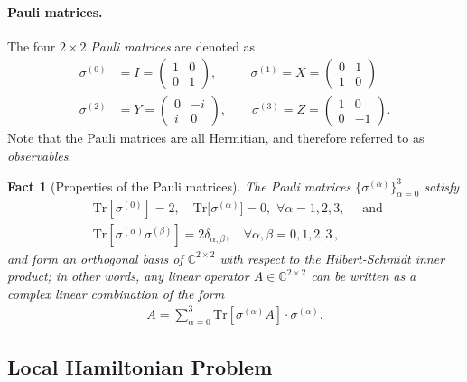 \documentclass[11pt]{article}
\theoremstyle{plain}
\newtheorem{fact}[theorem]{Fact}
\begin{document}
\paragraph{Pauli matrices.} The four $2\times 2$ \emph{Pauli matrices} are denoted as
    \begin{align}
        \sigma^{(0)} &= I = \begin{pmatrix} 1 & 0 \\0 & 1 \end{pmatrix}, \quad\quad\,\,\,\,\sigma^{(1)} = X = \begin{pmatrix} 0 & 1 \\ 1 & 0 \end{pmatrix}\\ \sigma^{(2)} &= Y = \begin{pmatrix} 0 & -i \\ i & 0 \end{pmatrix}, \quad\quad \sigma^{(3)} = Z = \begin{pmatrix} 1 & 0 \\ 0 & -1 \end{pmatrix}.
    \end{align}
Note that the Pauli matrices are all Hermitian, and therefore referred to as \emph{observables}.

\begin{fact}[Properties of the Pauli matrices]\label{fact:pauli-properties}
The Pauli matrices $\{\sigma^{(\alpha)}\}_{\alpha =0}^3$ satisfy
  \begin{align}\label{trace-of-product-of-paulis}
&\mathrm{Tr}[\sigma^{(0)}]=2, \quad\mathrm{Tr}\big[\sigma^{(\alpha)}\big]= 0, \,\, \forall\alpha =1,2,3, \quad \text{ and }\\
&\mathrm{Tr}\left[\sigma^{(\alpha)} \sigma^{(\beta)}\right] =  2 \delta_{\alpha,\beta}, \quad \forall \alpha,\beta =0,1,2,3\, ,
    \end{align}
and form an orthogonal basis of $\mathbb{C}^{2 \times 2}$ with respect to the Hilbert-Schmidt inner product; in other words, any linear operator $A \in \mathbb{C}^{2 \times 2}$ can be written as a complex linear combination of the form
\begin{align}
A = \sum_{\alpha=0}^3  \mathrm{Tr}\left[\sigma^{(\alpha)} A\right] \cdot \sigma^{(\alpha)}.
\end{align}
\end{fact}

\subsection{Local Hamiltonian Problem}
\end{document}
